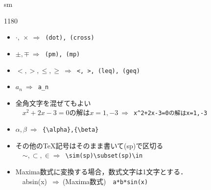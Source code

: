 \documentclass[landscape,10pt]{ujarticle}
\newcommand{\slidepage}[1][s]{%
\setcounter{ketpicctra}{18}%
\if#1m \setcounter{ketpicctra}{1}\fi
\hypersetup{linkcolor=black}%

\begin{layer}{118}{0}
\putnotee{122}{-\theketpicctra.05}{\small\thepage/\pageref{pageend}}
\end{layer}\hypersetup{linkcolor=blue}

}
\begin{document}
\slidepage
\begin{itemize}
\item
{}$\cdot,\ \times\ \Longrightarrow$\ \verb|(dot), (cross)|\vspace{-2mm}
\item
{}$\pm, \mp\ \Longrightarrow$\ \verb|(pm), (mp)|\vspace{-2mm}
\item
{}$<, >, \leq, \geq\ \Longrightarrow$\ \verb|<, >, (leq), (geq)|\vspace{-2mm}
\item
{}$a_n\ \Longrightarrow$\ \verb|a_n|\vspace{-2mm}
\item
全角文字を混ぜてもよい\\
　$x^2+2x-3=0$の解は$x=1,-3\ \Longrightarrow$\ \verb|x^2+2x-3=0の解はx=1,-3|\vspace{-2mm}
\item
{}$\alpha, \beta\ \Longrightarrow$\ \verb|{\alpha},{\beta}|\vspace{-2mm}
\item
その他の\TeX 記号はそのまま書いて(sp)で区切る\\
　$\sim, \subset, \in  \Longrightarrow$\ \verb|\sim(sp)\subset(sp)\in|\vspace{-2mm}
\item
Maxima数式に変換する場合，数式文字は1文字とする．\\
　absin(x)\ $\Longrightarrow \ $(Maxima数式)　\verb|a*b*sin(x)| \vspace{-2mm}
\end{itemize}



\vspace*{18mm}
\end{document}
